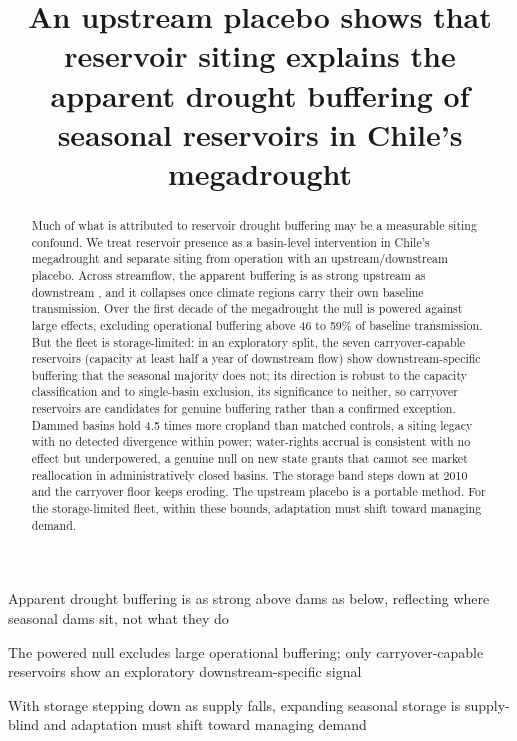 \documentclass[
]{agujournal2019}
\begin{document}
\title{An upstream placebo shows that reservoir siting explains the
apparent drought buffering of seasonal reservoirs in Chile's
megadrought}


\begin{keypoints}
\item Apparent drought buffering is as strong above dams as below,
reflecting where seasonal dams sit, not what they do \item The powered
null excludes large operational buffering; only carryover-capable
reservoirs show an exploratory downstream-specific signal \item With
storage stepping down as supply falls, expanding seasonal storage is
supply-blind and adaptation must shift toward managing demand 
\end{keypoints}

\begin{abstract}
Much of what is attributed to reservoir drought buffering may be a
measurable siting confound. We treat reservoir presence as a basin-level
intervention in Chile's megadrought and separate siting from operation
with an upstream/downstream placebo. Across streamflow, the apparent
buffering is as strong upstream as downstream , and it collapses once
climate regions carry their own baseline transmission. Over the first
decade of the megadrought the null is powered against large effects,
excluding operational buffering above 46 to 59\% of baseline
transmission. But the fleet is storage-limited: in an exploratory split,
the seven carryover-capable reservoirs (capacity at least half a year of
downstream flow) show downstream-specific buffering that the seasonal
majority does not; its direction is robust to the capacity
classification and to single-basin exclusion, its significance to
neither, so carryover reservoirs are candidates for genuine buffering
rather than a confirmed exception. Dammed basins hold 4.5 times more
cropland than matched controls, a siting legacy with no detected
divergence within power; water-rights accrual is consistent with no
effect but underpowered, a genuine null on new state grants that cannot
see market reallocation in administratively closed basins. The storage
band steps down at 2010 and the carryover floor keeps eroding. The
upstream placebo is a portable method. For the storage-limited fleet,
within these bounds, adaptation must shift toward managing demand.
\end{abstract}
\end{document}
